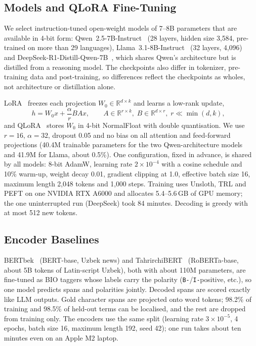 \documentclass[runningheads]{llncs}
\begin{document}
\subsection{Models and QLoRA Fine-Tuning}
\label{sec:models}

We select instruction-tuned open-weight models of 7--8B parameters that are available in 4-bit form: Qwen~2.5-7B-Instruct~\cite{Qwen2024-kr} (28 layers, hidden size 3,584, pre-trained on more than 29 languages), Llama~3.1-8B-Instruct~\cite{Grattafiori2024-ka} (32 layers, 4,096) and DeepSeek-R1-Distill-Qwen-7B~\cite{Guo2025}, which shares Qwen's architecture but is distilled from a reasoning model. The checkpoints also differ in tokenizer, pre-training data and post-training, so differences reflect the checkpoints as wholes, not architecture or distillation alone.

LoRA~\cite{Hu2021-fz} freezes each projection $W_0 \in \mathbb{R}^{d \times k}$ and learns a low-rank update,
\begin{equation}
\label{eq:lora}
h = W_0 x + \frac{\alpha}{r} B A x, \qquad A \in \mathbb{R}^{r \times k},\; B \in \mathbb{R}^{d \times r},\; r \ll \min(d, k),
\end{equation}
and QLoRA~\cite{3666122.3666563} stores $W_0$ in 4-bit NormalFloat with double quantisation. We use $r{=}16$, $\alpha{=}32$, dropout 0.05 and no bias on all attention and feed-forward projections (40.4M trainable parameters for the two Qwen-architecture models and 41.9M for Llama, about 0.5\%). One configuration, fixed in advance, is shared by all models: 8-bit AdamW, learning rate $2{\times}10^{-4}$ with a cosine schedule and 10\% warm-up, weight decay 0.01, gradient clipping at 1.0, effective batch size 16, maximum length 2,048 tokens and 1,000 steps. Training uses Unsloth, TRL and PEFT on one NVIDIA RTX A6000 and allocates 5.4--5.6\,GB of GPU memory; the one uninterrupted run (DeepSeek) took 84 minutes. Decoding is greedy with at most 512 new tokens.

\subsection{Encoder Baselines}
\label{sec:encoders}

BERTbek~\cite{kuriyozov-etal-2024-bertbek} (BERT-base, Uzbek news) and TahrirchiBERT~\cite{tahrirchibert2023} (RoBERTa-base, about 5B tokens of Latin-script Uzbek), both with about 110M parameters, are fine-tuned as BIO taggers whose labels carry the polarity (\texttt{B-}/\texttt{I-}positive, etc.), so one model predicts spans and polarities jointly. Decoded spans are scored exactly like LLM outputs. Gold character spans are projected onto word tokens; 98.2\% of training and 98.5\% of held-out terms can be localised, and the rest are dropped from training only. The encoders use the same split (learning rate $3{\times}10^{-5}$, 4 epochs, batch size 16, maximum length 192, seed 42); one run takes about ten minutes even on an Apple M2 laptop.
\end{document}
